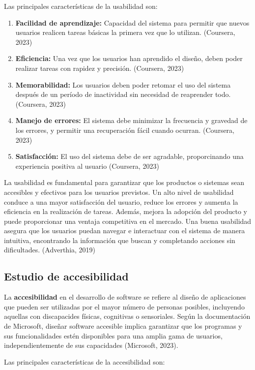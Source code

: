Las principales características de la usabilidad son: 
\begin{enumerate}
    \item \textbf{Facilidad de aprendizaje:} Capacidad del sistema para permitir que nuevos usuarios realicen tareas básicas la primera vez que lo utilizan. (Coursera, 2023)
    \item \textbf{Eficiencia:} Una vez que los usuarios han aprendido el diseño, deben poder realizar tareas con rapidez y precisión. (Coursera, 2023)
    \item \textbf{Memorabilidad:} Los usuarios deben poder retomar el uso del sistema después de un período de inactividad sin necesidad de reaprender todo. (Coursera, 2023)
    \item \textbf{Manejo de errores:} El sistema debe minimizar la frecuencia y gravedad de los errores, y permitir una recuperación fácil cuando ocurran. (Coursera, 2023)
    \item \textbf{Satisfacción:} El uso del sistema debe de ser agradable, proporcinando una experiencia positiva al usuario (Coursera, 2023) 
\end{enumerate}

La usabilidad es fundamental para garantizar que los productos o sistemas sean accesibles y efectivos para los usuarios previstos. Un alto nivel de usabilidad
conduce a una mayor satisfacción del usuario, reduce los errores y aumenta la eficiencia en la realización de tareas. Además, mejora la adopción del producto 
y puede proporcionar una ventaja competitiva en el mercado. Una buena usabilidad asegura que los usuarios puedan navegar e interactuar con el sistema de manera intuitiva, encontrando 
la información que buscan y completando acciones sin dificultades. (Adverthia, 2019)

\subsection{Estudio de accesibilidad}
La \textbf{accesibilidad} en el desarrollo de software se refiere al diseño de aplicaciones que pueden ser utilizadas por el mayor número de 
personas posibles, incluyendo aquellas con discapacides físicas, cognitivas o sensoriales. Según la documentación de Microsoft, diseñar software 
accesible implica garantizar que los programas y sus funcionalidades estén disponibles para una amplia gama de usuarios, independientemente de sus capacidades (Microsoft, 2023).

Las principales características de la accesibilidad son: 

